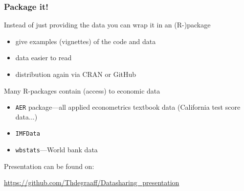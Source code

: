 \documentclass[ignorenonframetext]{beamer}
\begin{document}
\begin{frame}
  \frametitle{Package it!}
  Instead of just providing the data you can wrap it in an \alert{(R-)package}
  \begin{itemize}
    \item give examples (vignettes) of the code and data
    \item data easier to read
    \item distribution again via CRAN or \alert{GitHub}\newline
  \end{itemize}
  Many R-packages contain (access) to economic data
  \begin{itemize}
    \item \texttt{AER} package---all applied econometrics textbook data (California test score data...)
    \item \texttt{IMFData}
    \item \texttt{wbstats}---World bank data
  \end{itemize}

\end{frame}

\begin{frame}[standout]
  Presentation can be found on:

  \url{https://github.com/Thdegraaff/Datasharing_presentation}
\end{frame}
\end{document}

